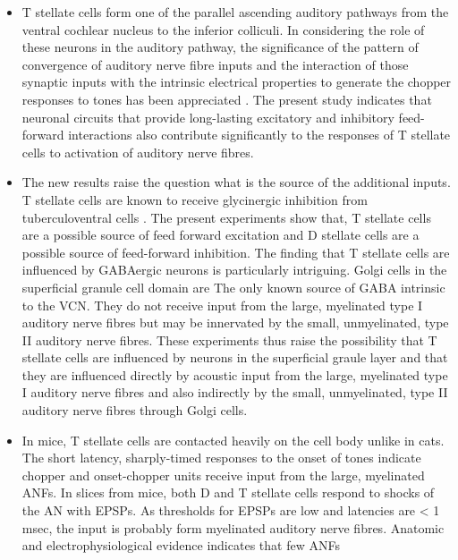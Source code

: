 \documentclass[10pt,a4paper]{article}
\begin{document}
\begin{itemize}
\item T stellate cells form one of the parallel ascending auditory pathways from
  the ventral cochlear nucleus to the inferior colliculi.  In considering the
  role of these neurons in the auditory pathway, the significance of the pattern
  of convergence of auditory nerve fibre inputs and the interaction of those
  synaptic inputs with the intrinsic electrical properties to generate the
  chopper responses to tones has been appreciated
  \citep{BanksSachs:1991,MolnarPfeiffer:1968;Oertel:1983,WangSachs:1995,WhiteYoungEtAl:1994,WuOertel:1984}
  . The present study indicates that neuronal circuits that provide long-lasting
  excitatory and inhibitory feed-forward interactions also contribute
  significantly to the responses of T stellate cells to activation of auditory
  nerve fibres.
\item The new results raise the question what is the source of the additional
  inputs. T stellate cells are known to receive glycinergic inhibition from
  tuberculoventral cells \citep{WickesbergOertel:1990} .  The present
  experiments show that, T stellate cells are a possible source of feed forward
  excitation and D stellate cells are a possible source of feed-forward
  inhibition. The finding that T stellate cells are influenced by GABAergic
  neurons is particularly intriguing. Golgi cells in the superficial granule
  cell domain are The only known source of GABA intrinsic to the VCN. They do
  not receive input from the large, myelinated type I auditory nerve fibres but
  may be innervated by the small, unmyelinated, type II auditory nerve fibres.
  These experiments thus raise the possibility that T stellate cells are
  influenced by neurons in the superficial graule layer and that they are
  influenced directly by acoustic input from the large, myelinated type I
  auditory nerve fibres and also indirectly by the small, unmyelinated, type II
  auditory nerve fibres through Golgi cells.
\item In mice, T stellate cells are contacted heavily on the cell body unlike in
  cats.  The short latency, sharply-timed responses to the onset of tones
  indicate chopper and onset-chopper units receive input from the large,
  myelinated ANFs.  In slices from mice, both D and T stellate cells respond to
  shocks of the AN with EPSPs.  As thresholds for EPSPs are low and latencies
  are {\textless} 1 msec, the input is probably form myelinated auditory nerve
  fibres.  Anatomic and electrophysiological evidence indicates that few ANFs

\end{itemize}
\end{document}
